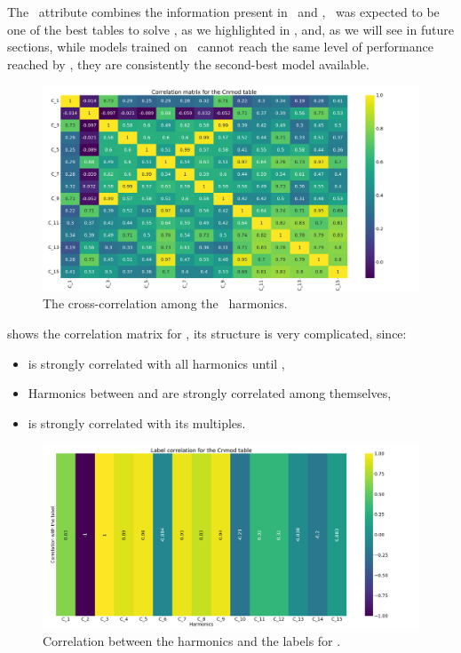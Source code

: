 \subsubsection{\cnmod}
The \cnmod\ attribute combines the information present in \an\ and \bn, \cnmod\ was expected to be one
of the best tables to solve \qrp, as we highlighted in , and, as we will see in
future sections, while models trained on \cnmod\ cannot reach the same level of performance reached
by \an, they are consistently the second-best model available.
\begin{figure}[!ht]
	\centering
	\includegraphics[width=\linewidth]{img/Cnmod_corr_matrix.png}
	\caption{The cross-correlation among the \cnmod\ harmonics.} \label{fig:cnmod-corr}
\end{figure}

 shows the correlation matrix for \cnmod, its structure is very complicated,
since:
\begin{itemize}
	\item \cnmod[2] is strongly correlated with all harmonics until \cnmod[9],
	\item Harmonics between \cnmod[10] and \cnmod[15] are strongly correlated among themselves,
	\item \cnmod[4] is strongly correlated with its multiples.
\end{itemize}
\begin{figure}[!ht]
	\centering
	\includegraphics[width=\linewidth]{img/Cnmod_label_corr.png}
	\caption{Correlation between the harmonics and the labels for \cnmod.} \label{fig:cnmod-lcorr}
\end{figure}

